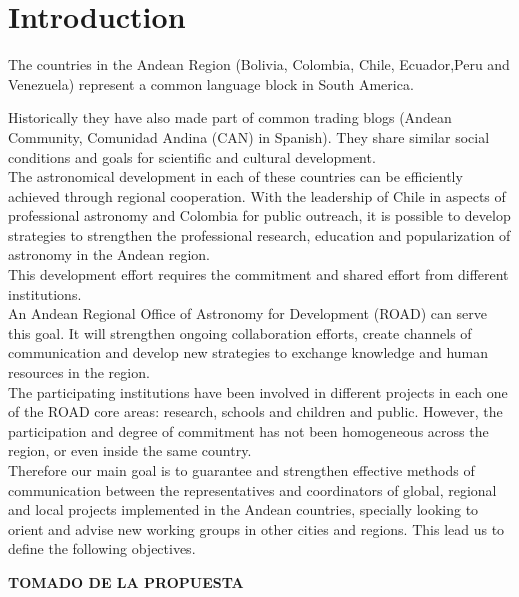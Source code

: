 \newpage
\section{Introduction}

The countries in the Andean Region (Bolivia, Colombia, Chile, Ecuador,Peru and Venezuela) represent a common language block in South America.
 
Historically they have also made part of common trading blogs (Andean Community, Comunidad Andina (CAN) in Spanish).
They share similar social conditions and goals for scientific and cultural development.
\\

The astronomical development in each of these countries can be efficiently achieved through regional cooperation. With the leadership of Chile in aspects of professional astronomy and Colombia for public outreach, it is possible to develop strategies to strengthen the professional research, education and popularization of astronomy in the Andean region.
\\

This development effort requires the commitment and shared effort from different institutions.
\\

An Andean Regional Office of Astronomy for Development (ROAD) can serve this goal. It will strengthen ongoing collaboration efforts, create channels of communication and develop new strategies to exchange knowledge and human resources in the region. 
\\

The participating institutions have been involved in different projects in each one of the ROAD core areas: research, schools and children and public. However, the participation and degree of commitment has not been homogeneous across the region, or even inside the same country.
\\

Therefore our main goal is to guarantee and strengthen effective methods of communication between the representatives and coordinators of global, regional and local projects implemented in the Andean countries, specially looking to orient and advise new working groups
in other cities and regions. This lead us to define the following objectives.
 
\newline
\textbf{TOMADO DE LA PROPUESTA}
